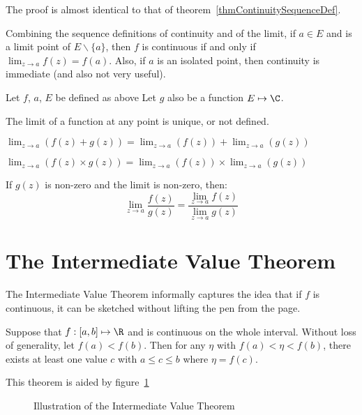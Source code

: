 \documentclass[../Main.tex]{subfiles}
\begin{document}
The proof is almost identical to that of theorem~\ref{thmContinuitySequenceDef}.\par
\begin{remark}
    Combining the sequence definitions of continuity and of the limit, if $a \in E$ and is a limit point of $E \backslash \{a\}$, then $f$ is continuous if and only if $\lim_{z \to a} f(z) = f(a)$. Also, if $a$ is an isolated point, then continuity is immediate (and also not very useful).
\end{remark}
\begin{propositions}{
        Let $f$, $a$, $E$ be defined as above Let $g$ also be a function $E \mapsto \C$.
        \label{propsLimitProperties}
    }
    \item The limit of a function at any point is unique, or not defined. \label{propLimitUnique}
    \item $\lim_{z \to a} (f(z) + g(z)) = \lim_{z \to a}(f(z)) + \lim_{z \to a} (g(z))$ \label{propLimitSum}
    \item $\lim_{z \to a} (f(z) \times g(z)) = \lim_{z \to a}(f(z)) \times \lim_{z \to a} (g(z))$ \label{propLimitProduct}
    \item If $g(z)$ is non-zero and the limit is non-zero, then:
        \begin{equation*}
            \lim_{z \to a} \frac{f(z)}{g(z)} = \frac{\lim_{z \to a} f(z)}{\lim_{z \to a} g(z)}
        \end{equation*}
\end{propositions}
\section{The Intermediate Value Theorem}
The Intermediate Value Theorem informally captures the idea that if $f$ is continuous, it can be sketched without lifting the pen from the page.
\begin{theorem}
    Suppose that $f : [a, b] \mapsto \R$ and is continuous on the whole interval. Without loss of generality, let $f(a) < f(b)$. Then for any $\eta$ with $f(a) < \eta < f(b)$, there exists at least one value $c$ with $a \leq c \leq b$ where $\eta = f(c)$.
\end{theorem}
This theorem is aided by figure~\ref{figIntermediateValue}
\begin{figure}[ht]
    \centering
    \caption{Illustration of the Intermediate Value Theorem}
    \label{figIntermediateValue}
\end{figure}
\end{document}
